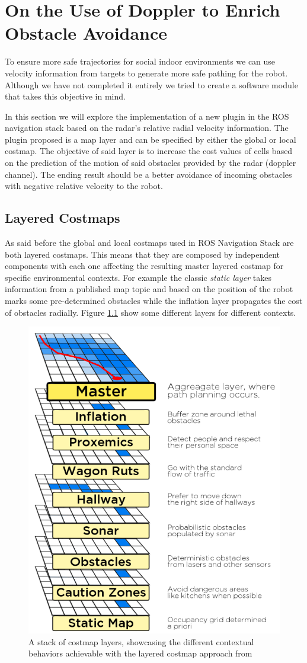 \chapter{On the Use of Doppler to Enrich Obstacle Avoidance}
To ensure more safe trajectories for social indoor environments we can use velocity information from targets to generate more safe pathing for  the robot. Although we have not completed it entirely  we tried to create a software module that takes this objective in mind.

In this section we will explore the implementation of a new plugin in the ROS navigation stack based on the radar's relative radial velocity information. The plugin proposed is a map layer and can be specified by either the global or local costmap. The objective of said layer is to increase the cost values of cells based on the prediction of the motion of said obstacles provided by the radar (doppler channel). The ending result should be a better avoidance of incoming obstacles with negative relative velocity  to the robot.

\section{Layered Costmaps}
As said before the global and local costmaps used in \ac{ROS} Navigation Stack are both layered costmaps.
This means that they are composed by independent components with each one affecting the resulting master layered costmap for specific environmental contexts. For example the classic \textit{static layer} takes information from a published map topic and based on the position of the robot marks some  pre-determined obstacles while the inflation layer propagates the cost of obstacles radially.  Figure \ref{fig::layers} show some different layers for different contexts.
\begin{figure}[ht!] 
\centerline{\includegraphics [width=0.5 \textwidth]{imgs/chapter6/layers.png}}
\caption[A stack of costmap layers]{A stack of costmap layers, showcasing the different contextual
behaviors achievable with the layered costmap approach from \cite{lu2014layered}}
\label{fig::layers}
\end{figure}

